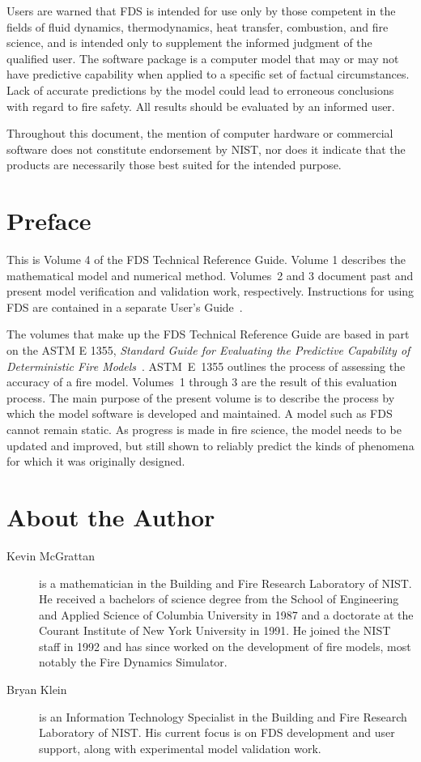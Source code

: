 \documentclass[11pt]{book}
\begin{document}
Users are warned that FDS is intended for use only by those competent
in the fields of fluid dynamics, thermodynamics, heat transfer, combustion, and fire science,
and is intended only to supplement the informed judgment of the qualified user.
The software package is a computer model that may or may not have predictive
capability when applied to a specific set of factual circumstances.
Lack of accurate predictions by the model could lead to erroneous
conclusions with regard to fire safety. All results should be evaluated by an informed user.

Throughout this document, the mention of computer hardware or commercial
software does not constitute endorsement by NIST, nor does it indicate that
the products are necessarily those best suited for the intended purpose.

\chapter{Preface}

This is Volume 4 of the FDS Technical Reference Guide. Volume 1 describes the mathematical model and numerical method. Volumes~2 and 3 document past and
present model verification and validation work, respectively. Instructions for using FDS are contained in a separate User's Guide~\cite{FDS_Users_Guide_5}.

The volumes that make up the FDS Technical Reference Guide are based in part on the ASTM E 1355, {\em Standard Guide for Evaluating the Predictive Capability of
Deterministic Fire Models}~\cite{ASTM:E1355}. ASTM~E~1355 outlines the process of assessing the accuracy of a fire model. Volumes~1 through 3 are the
result of this evaluation process. The main purpose of the present volume is to describe the process by which the model software is developed and maintained. A model such
as FDS cannot remain static. As progress is made in fire science, the model needs to be updated and improved, but still shown to reliably predict the kinds of
phenomena for which it was originally designed.


\chapter{About the Author}

\begin{description}
\item[Kevin McGrattan] is a mathematician in the Building and Fire
Research Laboratory of NIST. He received a bachelors of science degree
from the School of Engineering and Applied Science of Columbia
University in 1987 and a doctorate at the Courant Institute of New
York University in 1991. He joined the NIST staff in 1992 and has
since worked on the development of fire models, most notably the Fire
Dynamics Simulator.
\item[Bryan Klein] is an Information Technology Specialist in the
Building and Fire Research Laboratory of NIST. His current focus is on FDS development and
user support, along with experimental model validation work.
\end{description}
\end{document}
